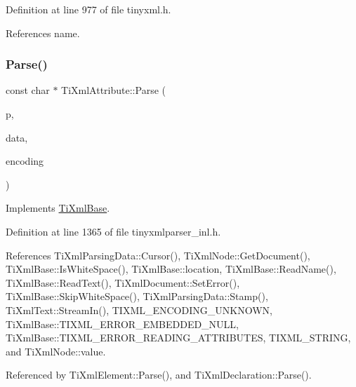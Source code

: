 Definition at line 977 of file tinyxml.\+h.



References name.

\hypertarget{class_ti_xml_attribute_ad62774421b814894b995af3b5d231dda}{}\label{class_ti_xml_attribute_ad62774421b814894b995af3b5d231dda} 
\subsubsection{\texorpdfstring{Parse()}{Parse()}}
{\footnotesize\ttfamily const char $\ast$ Ti\+Xml\+Attribute\+::\+Parse (\begin{DoxyParamCaption}\item[{const char $\ast$}]{p,  }\item[{\hyperlink{class_ti_xml_parsing_data}{Ti\+Xml\+Parsing\+Data} $\ast$}]{data,  }\item[{\hyperlink{tinyxml_8h_a88d51847a13ee0f4b4d320d03d2c4d96}{Ti\+Xml\+Encoding}}]{encoding }\end{DoxyParamCaption})\hspace{0.3cm}{\ttfamily [virtual]}}



Implements \hyperlink{class_ti_xml_base_a00e4edb0219d00a1379c856e5a1d2025}{Ti\+Xml\+Base}.



Definition at line 1365 of file tinyxmlparser\+\_\+inl.\+h.



References Ti\+Xml\+Parsing\+Data\+::\+Cursor(), Ti\+Xml\+Node\+::\+Get\+Document(), Ti\+Xml\+Base\+::\+Is\+White\+Space(), Ti\+Xml\+Base\+::location, Ti\+Xml\+Base\+::\+Read\+Name(), Ti\+Xml\+Base\+::\+Read\+Text(), Ti\+Xml\+Document\+::\+Set\+Error(), Ti\+Xml\+Base\+::\+Skip\+White\+Space(), Ti\+Xml\+Parsing\+Data\+::\+Stamp(), Ti\+Xml\+Text\+::\+Stream\+In(), T\+I\+X\+M\+L\+\_\+\+E\+N\+C\+O\+D\+I\+N\+G\+\_\+\+U\+N\+K\+N\+O\+WN, Ti\+Xml\+Base\+::\+T\+I\+X\+M\+L\+\_\+\+E\+R\+R\+O\+R\+\_\+\+E\+M\+B\+E\+D\+D\+E\+D\+\_\+\+N\+U\+LL, Ti\+Xml\+Base\+::\+T\+I\+X\+M\+L\+\_\+\+E\+R\+R\+O\+R\+\_\+\+R\+E\+A\+D\+I\+N\+G\+\_\+\+A\+T\+T\+R\+I\+B\+U\+T\+ES, T\+I\+X\+M\+L\+\_\+\+S\+T\+R\+I\+NG, and Ti\+Xml\+Node\+::value.



Referenced by Ti\+Xml\+Element\+::\+Parse(), and Ti\+Xml\+Declaration\+::\+Parse().

\hypertarget{class_ti_xml_attribute_afc7bbfdf83d59fbc4ff5e283d27b5d7d}{}\label{class_ti_xml_attribute_afc7bbfdf83d59fbc4ff5e283d27b5d7d} 
